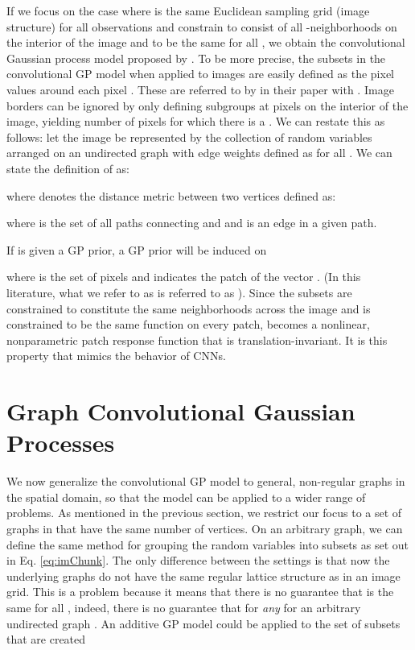 \documentclass{article}
\begin{document}
If we focus on the case where  is the same Euclidean sampling grid (image structure) for all observations and constrain  to consist of all -neighborhoods on the interior of the image and  to be the same  for all , we obtain the convolutional Gaussian process model proposed by \citet{convgp}. To be more precise, the subsets in the convolutional GP model when applied to images are easily defined as the  pixel values around each pixel . These are referred to by  in their paper with . Image borders can be ignored by only defining subgroups at pixels on the interior of the image, yielding  number of pixels  for which there is a . We can restate this as follows: let the image be represented by the collection of random variables  arranged on an undirected graph with edge weights  defined as  for all . We can state the definition of  as:
 

where  denotes the distance metric between two vertices defined as:

where  is the set of all paths connecting  and  and  is an edge in a given path.  

If  is given a GP prior, a GP prior will be induced on 

where  is the set of pixels and  indicates the  patch of the vector . (In this literature, what we refer to as  is referred to as ).
Since the subsets are constrained to constitute the same neighborhoods across the image and  is constrained to be the same function on every patch,  becomes a nonlinear, nonparametric patch response function that is translation-invariant. It is this property that mimics the behavior of CNNs.

\section{Graph Convolutional Gaussian Processes}

We now generalize the convolutional GP model to general, non-regular graphs in the spatial domain, so that the model can be applied to a wider range of problems. As mentioned in the previous section, we restrict our focus to a set of graphs in  that have the same number of vertices. On an arbitrary graph, we can define the same method for grouping the random variables into subsets as set out in Eq. \eqref{eq:imChunk}. The only difference between the settings is that now the underlying graphs do not have the same regular lattice structure as in an image grid. This is a problem because it means that there is no guarantee that  is the same for all , indeed, there is no guarantee that  for \textit{any}  for an arbitrary undirected graph .
An additive GP model could be applied to the set of subsets that are created
\end{document}
